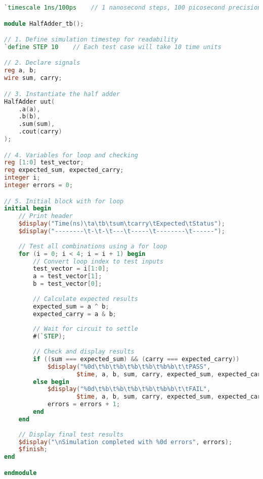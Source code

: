 \documentclass[12pt]{betterjournal}
\begin{document}
\begin{lstlisting}[language=verilog]
`timescale 1ns/100ps    // 1 nanosecond steps, 100 picosecond precision

module HalfAdder_tb();

// 1. Define simulation timestep for readability
`define STEP 10    // Each test case will take 10 time units

// 2. Declare signals
reg a, b;           
wire sum, carry;    

// 3. Instantiate the half adder
HalfAdder uut(
    .a(a),
    .b(b),
    .sum(sum),
    .cout(carry)
);

// 4. Variables for loop and checking
reg [1:0] test_vector;
reg expected_sum, expected_carry;
integer i;
integer errors = 0;

// 5. Initial block with for loop
initial begin
    // Print header
    $display("Time(ns)\ta\tb\tsum\tcarry\tExpected\tStatus");
    $display("--------\t-\t-\t---\t-----\t--------\t------");
    
    // Test all combinations using a for loop
    for (i = 0; i < 4; i = i + 1) begin
        // Convert loop index to test inputs
        test_vector = i[1:0];
        a = test_vector[1];
        b = test_vector[0];
        
        // Calculate expected results
        expected_sum = a ^ b;
        expected_carry = a & b;
        
        // Wait for circuit to settle
        #(`STEP);
        
        // Check and display results
        if ((sum === expected_sum) && (carry === expected_carry))
            $display("%0d\t%b\t%b\t%b\t%b\t%b%b\t\tPASS", 
                    $time, a, b, sum, carry, expected_sum, expected_carry);
        else begin
            $display("%0d\t%b\t%b\t%b\t%b\t%b%b\t\tFAIL", 
                    $time, a, b, sum, carry, expected_sum, expected_carry);
            errors = errors + 1;
        end
    end
    
    // Display final test results
    $display("\nSimulation completed with %0d errors", errors);
    $finish;
end

endmodule
\end{lstlisting}
\end{document}
